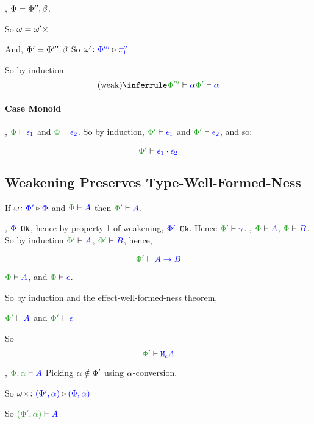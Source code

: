 {    \bi, $\Phi = \Phi'', \beta$.

    So $\omega = \omega'\times$

    And, $\Phi' = \Phi''', \beta$
    So \bi $\omega' \colon {\color{blue}\Phi'''} \triangleright {\color {blue} \pi_1''}$

    So by induction
    \begin{equation}
        \ntreeruleI{weak}{\wellformed{\P'''}{\a}}{\wellformed{\P'}{\a}}
    \end{equation}


    \paragraph{Case Monoid}

    \bi, $\wellformed{\P}{\e_1}$ and $\wellformed{\P}{\e_2}$. So by induction,
    $\wellformed{\P'}{\e_1}$ and $\wellformed{\P'}{\e_2}$, and so:

    \begin{equation}
        \wellformed{\P'}{\e_1\dot\e_2}
    \end{equation}

    
    \subsection{Weakening Preserves Type-Well-Formed-Ness}

    If $\omega \colon {\color{blue}\Phi'} \triangleright {\color {blue} \Phi}$ and $\wellformed{\P}{A}$ then $\wellformed{\P'}{A}$.

    \proof
    \bi, ${\color{blue} \Phi} \texttt{ Ok}$, hence by property 1 of weakening, ${\color{blue} \Phi'} \texttt{ Ok}$. Hence $\wellformed{\P'}{\g}$.
    \bi, $\wellformed{\P}{A}$, $\wellformed{\P}{B}$.
    So by induction $\wellformed{\P'}{A}$, $\wellformed{\P'}{B}$, hence,

    $$\wellformed{\P'}{\ab}$$


    \bi $\wellformed{\P}{A}$, and $\wellformed{\P}{\e}$.

    So by induction and the effect-well-formed-ness theorem, 

    $\wellformed{\P'}{A}$ and $\wellformed{\P'}{\e}$

    So $$\wellformed{\P'}{\mea}$$

    \bi, $\wellformed{\P,\a}{A}$
    Picking $\alpha\notin\Phi'$ using $\alpha$-conversion.

    So $\omega\times \colon {\color{blue}(\Phi', \alpha)} \triangleright {\color {blue} (\Phi, \alpha)}$

    So $\wellformed{(\P', \a)}{A}$

}
